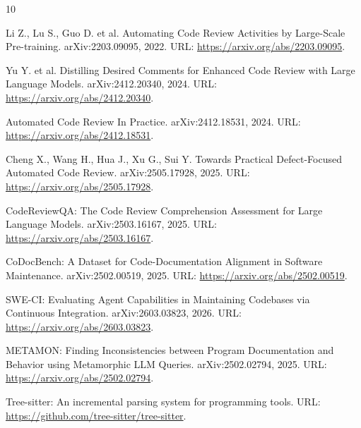 \documentclass[12pt,a4paper]{article}
\begin{document}
\begin{thebibliography}{10}

Li Z., Lu S., Guo D. et al. Automating Code Review Activities by Large-Scale
Pre-training. arXiv:2203.09095, 2022. URL:
\url{https://arxiv.org/abs/2203.09095}.

Yu Y. et al. Distilling Desired Comments for Enhanced Code Review with Large
Language Models. arXiv:2412.20340, 2024. URL:
\url{https://arxiv.org/abs/2412.20340}.

Automated Code Review In Practice. arXiv:2412.18531, 2024. URL:
\url{https://arxiv.org/abs/2412.18531}.

Cheng X., Wang H., Hua J., Xu G., Sui Y. Towards Practical Defect-Focused
Automated Code Review. arXiv:2505.17928, 2025. URL:
\url{https://arxiv.org/abs/2505.17928}.

CodeReviewQA: The Code Review Comprehension Assessment for Large Language
Models. arXiv:2503.16167, 2025. URL:
\url{https://arxiv.org/abs/2503.16167}.

CoDocBench: A Dataset for Code-Documentation Alignment in Software Maintenance.
arXiv:2502.00519, 2025. URL: \url{https://arxiv.org/abs/2502.00519}.

SWE-CI: Evaluating Agent Capabilities in Maintaining Codebases via Continuous
Integration. arXiv:2603.03823, 2026. URL:
\url{https://arxiv.org/abs/2603.03823}.

METAMON: Finding Inconsistencies between Program Documentation and Behavior
using Metamorphic LLM Queries. arXiv:2502.02794, 2025. URL:
\url{https://arxiv.org/abs/2502.02794}.

Tree-sitter: An incremental parsing system for programming tools. URL:
\url{https://github.com/tree-sitter/tree-sitter}.

\end{thebibliography}
\end{document}
